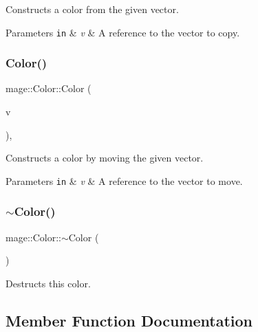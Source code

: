 Constructs a color from the given vector.


\begin{DoxyParams}[1]{Parameters}
\mbox{\tt in}  & {\em v} & A reference to the vector to copy. \\
\hline
\end{DoxyParams}
\hypertarget{structmage_1_1_color_a6e01540c01b2923974ca31e1621f1f7e}{}\label{structmage_1_1_color_a6e01540c01b2923974ca31e1621f1f7e} 
\subsubsection{\texorpdfstring{Color()}{Color()}\hspace{0.1cm}{\footnotesize\ttfamily [6/6]}}
{\footnotesize\ttfamily mage\+::\+Color\+::\+Color (\begin{DoxyParamCaption}\item[{X\+M\+F\+L\+O\+A\+T4 \&\&}]{v }\end{DoxyParamCaption})\hspace{0.3cm}{\ttfamily [explicit]}, {\ttfamily [noexcept]}}

Constructs a color by moving the given vector.


\begin{DoxyParams}[1]{Parameters}
\mbox{\tt in}  & {\em v} & A reference to the vector to move. \\
\hline
\end{DoxyParams}
\hypertarget{structmage_1_1_color_aa4df1c9718b7846adf77fbeed79ac219}{}\label{structmage_1_1_color_aa4df1c9718b7846adf77fbeed79ac219} 
\subsubsection{\texorpdfstring{$\sim$\+Color()}{~Color()}}
{\footnotesize\ttfamily mage\+::\+Color\+::$\sim$\+Color (\begin{DoxyParamCaption}{ }\end{DoxyParamCaption})\hspace{0.3cm}{\ttfamily [default]}}

Destructs this color. 

\subsection{Member Function Documentation}
\hypertarget{structmage_1_1_color_a194847cf864911d7ceff16aabec1459f}{}\label{structmage_1_1_color_a194847cf864911d7ceff16aabec1459f} 
